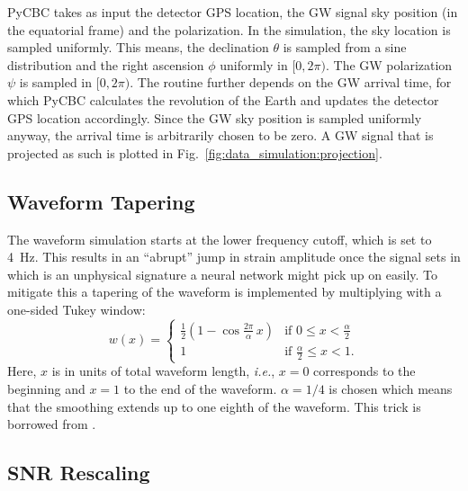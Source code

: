 PyCBC takes as input the detector GPS location, the GW signal sky position (in the equatorial frame) and the polarization.
In the simulation, the sky location is sampled uniformly. This means, the declination $\theta$ is sampled from a sine distribution and the right ascension $\phi$ uniformly in $[0, 2\pi)$. The GW polarization $\psi$ is sampled in $[0, 2\pi)$.
The routine further depends on the GW arrival time, for which PyCBC calculates the revolution of the Earth and updates the detector GPS location accordingly.
Since the GW sky position is sampled uniformly anyway, the arrival time is arbitrarily chosen to be zero. 
A GW signal that is projected as such is plotted in Fig.~\ref{fig:data_simulation:projection}.

\subsection*{Waveform Tapering}

The waveform simulation starts at the lower frequency cutoff, which is set to \SI{4}{\hertz}. This results in an \enquote{abrupt} jump in strain amplitude once the signal sets in which is an unphysical signature a neural network might pick up on easily. To mitigate this a tapering of the waveform is implemented by multiplying with a one-sided Tukey window:
\begin{equation}
	w(x) = \begin{cases}
		\frac{1}{2}(1-\cos{\frac{2\pi}{\alpha}\,x}) & \text{if } 0\leq x <\frac{\alpha}{2}\\
		1 & \text{if } \frac{\alpha}{2}\leq x<1.
	\end{cases}
\end{equation}
Here, $x$ is in units of total waveform length, \emph{i.e.}, $x=0$ corresponds to the beginning and $x=1$ to the end of the waveform. $\alpha = 1/4$ is chosen which means that the smoothing extends up to one eighth of the waveform. This trick is borrowed from \cite{PhysRevD.100.063015}.

\subsection*{SNR Rescaling}

